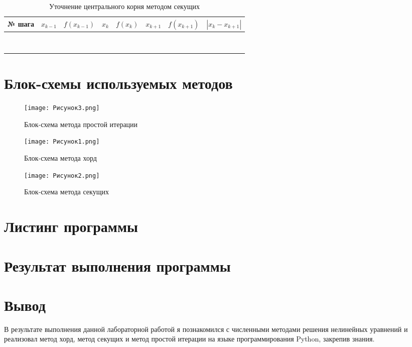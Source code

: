\documentclass[12pt]{report}
\begin{document}
	\begin{table}[h!]
		\centering
		\begin{tabular}{|c|c|c|c|c|c|c|c|}
			\hline
			№ шага & $x_{k-1}$ & $f(x_{k-1})$ & $x_k$ & $f(x_k)$ & $x_{k+1}$ & $f(x_{k+1})$ & $|x_k - x_{k+1}|$ \\ \hline
			&  &  &  &  &  &  & \\ \hline
			&  &  &  &  &  &  & \\ \hline
			&  &  &  &  &  &  & \\ \hline
			&  &  &  &  &  &  & \\ \hline
			&  &  &  &  &  &  & \\ \hline
			&  &  &  &  &  &  & \\ \hline
			&  &  &  &  &  &  & \\ \hline
			&  &  &  &  &  &  & \\ \hline
		\end{tabular}
		\caption{Уточнение центрального корня методом секущих}
		\label{tab:3}
	\end{table}	
	\newpage
	
	\section*{Блок-схемы используемых методов}
	
	\begin{figure}[htbp]
		\centering
		\texttt{[image: Рисунок3.png]}
		\caption{Блок-схема метода простой итерации}
		
		\texttt{[image: Рисунок1.png]}
		\caption{Блок-схема метода хорд}
		
		\texttt{[image: Рисунок2.png]}
		\caption{Блок-схема метода секущих}
	\end{figure}
	
	\section*{Листинг программы}
	
	\section*{Результат выполнения программы}
	
	\section*{Вывод}
	В результате выполнения данной лабораторной работой я познакомился с численными методами решения нелинейных уравнений и реализовал метод хорд, метод секущих и метод простой итерации на языке программирования Python, закрепив знания.
\end{document}
